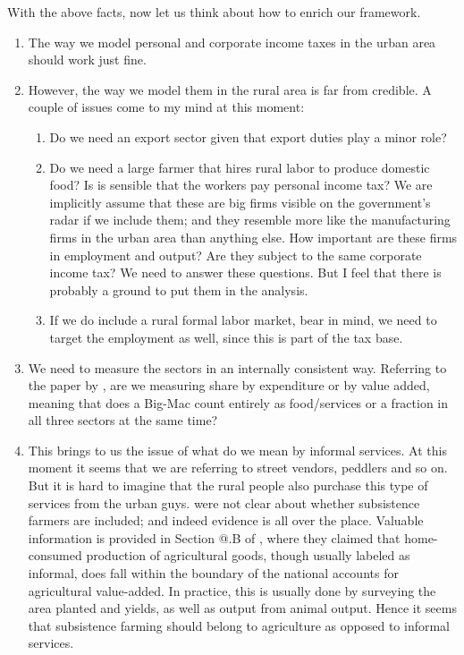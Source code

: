 \documentclass[twoside,11pt,leqno]{article}
\makeatletter
\newcommand*{\rom}[1]{\expandafter\@slowromancap\romannumeral #1@}
\makeatother
\begin{document}
With the above facts, now let us think about how to enrich our framework.
\begin{enumerate}
    \item
    The way we model personal and corporate income taxes in the urban area should work just fine.
    \item
    However, the way we model them in the rural area is far from credible. A couple of issues come to my mind at this moment:
    \begin{enumerate}
        \item
        Do we need an export sector given that export duties play a minor role?
        \item
        Do we need a large farmer that hires rural labor to produce domestic food? Is is sensible that the workers pay personal income tax? We are implicitly assume that these are big firms visible on the government's radar if we include them; and they resemble more like the manufacturing firms in the urban area than anything else. How important are these firms in employment and output? Are they subject to the same corporate income tax? We need to answer these questions. But I feel that there is probably a ground to put them in the analysis.
        \item
        If we do include a rural formal labor market, bear in mind, we need to target the employment as well, since this is part of the tax base.
    \end{enumerate}
    \item
    We need to measure the sectors in an internally consistent way. Referring to the paper by \citet{Herrendorfetal:2013}, are we measuring share by expenditure or by value added, meaning that does a Big-Mac count entirely as food/services or a fraction in all three sectors at the same time?
    \item
    This brings to us the issue of what do we mean by informal services. At this moment it seems that we are referring to street vendors, peddlers and so on. But it is hard to imagine that the rural people also purchase this type of services from the urban guys. \citet{SchneiderEnste:2000} were not clear about whether subsistence farmers are included; and indeed evidence is all over the place. Valuable information is provided in Section \rom{3}.B of \citet{Gollinetal:2013}, where they claimed that home-consumed production of agricultural goods, though usually labeled as informal, does fall within the boundary of the national accounts for agricultural value-added. In practice, this is usually done by surveying the area planted and yields, as well as output from animal output. Hence it seems that subsistence farming should belong to agriculture as opposed to informal services.


\end{enumerate}
\end{document}
